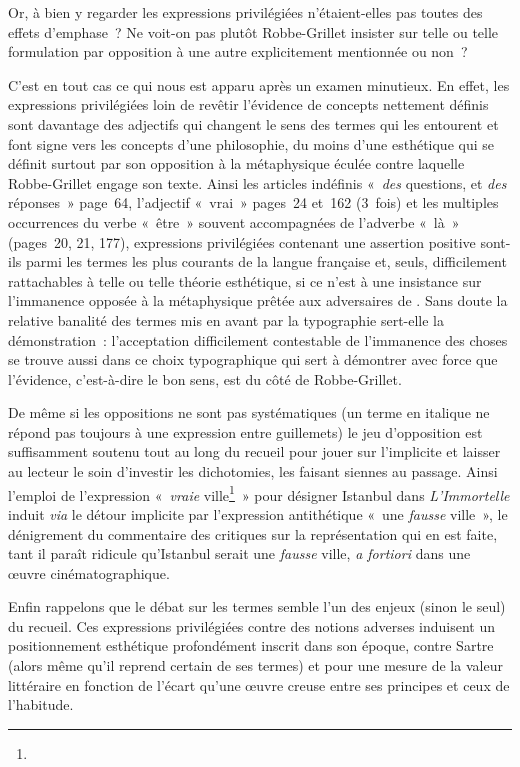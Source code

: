 Or, à bien y regarder les expressions privilégiées n'étaient-elles pas toutes des effets d'emphase~? Ne voit-on pas plutôt Robbe-Grillet insister sur telle ou telle formulation par opposition à une autre explicitement mentionnée ou non~? 


C'est en tout cas ce qui nous est apparu après un examen minutieux. En effet, les expressions privilégiées loin de revêtir l'évidence de concepts nettement définis sont davantage des adjectifs qui changent le sens des termes qui les entourent et font signe vers les concepts d'une philosophie, du moins d'une esthétique qui se définit surtout par son opposition à la métaphysique éculée contre laquelle Robbe-Grillet engage son texte. Ainsi les articles indéfinis «~\textit{des} questions, et \textit{des} réponses~» page~64, l'adjectif «~vrai~» pages~24 et~162 (3~fois) et les multiples occurrences du verbe «~être~» souvent accompagnées de l'adverbe «~là~» (pages~20, 21, 177), expressions privilégiées contenant une assertion positive sont-ils parmi les termes les plus courants de la langue française et, seuls, difficilement rattachables à telle ou telle théorie esthétique, si ce n'est à une insistance sur l'immanence opposée à la métaphysique prêtée aux adversaires de \robbe{}. Sans doute la relative banalité des termes mis en avant par la typographie sert-elle la démonstration~: l'acceptation difficilement contestable de l'immanence des choses  se trouve aussi dans ce choix typographique qui sert à démontrer avec force que l'évidence, c'est-à-dire le bon sens, est du côté de Robbe-Grillet.





De même si les oppositions ne sont pas systématiques (un terme en italique ne répond pas toujours à une expression entre guillemets) le jeu d'opposition est suffisamment soutenu tout au long du recueil pour jouer sur l'implicite et laisser au lecteur le soin d'investir les dichotomies, les faisant siennes au passage. Ainsi l'emploi de l'expression «~\textit{vraie} ville\footnote{}~» pour désigner Istanbul dans \textit{L'Immortelle} induit \textit{via} le détour implicite par l'expression antithétique «~une \textit{fausse} ville~», le dénigrement du commentaire des critiques sur la représentation qui en est faite, tant il paraît ridicule qu'Istanbul serait une \textit{fausse} ville, \textit{a fortiori} dans une œuvre cinématographique.


Enfin rappelons que le débat sur les termes semble l'un des enjeux (sinon le seul) du recueil. Ces expressions privilégiées contre des notions adverses induisent un positionnement esthétique profondément inscrit dans son époque, contre Sartre (alors même qu'il reprend certain de ses termes) et pour une mesure de la valeur littéraire en fonction de l'écart qu'une œuvre creuse entre ses principes et ceux de l'habitude.


